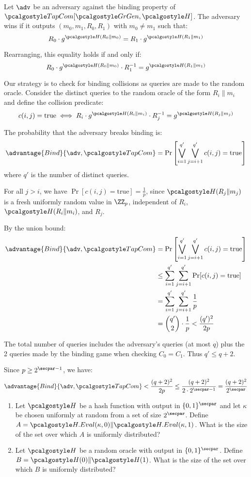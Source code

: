 \ifsolutions
\begin{mysolution}
  Let $\adv$ be an adversary against the binding property of $\algo{TapCom}[\grgen, \algo{H}]$. The adversary wins if it outputs $(m_0, m_1, R_0, R_1)$ with $m_0 \neq m_1$ such that:
  \[
  R_0 \cdot g^{\algo{H}(R_0 \| m_0)} = R_1 \cdot g^{\algo{H}(R_1 \| m_1)}
  \]

  Rearranging, this equality holds if and only if:
  \[
  R_0 \cdot g^{\algo{H}(R_0 \| m_0)} \cdot R_1^{-1} = g^{\algo{H}(R_1 \| m_1)}
  \]

  Our strategy is to check for binding collisions as queries are made to the random oracle.
  Consider the distinct queries to the random oracle of the form $R_i \| m_i$ and define the collision predicate:
  \[
  c(i, j) = \text{true} \iff R_i \cdot g^{\algo{H}(R_i \| m_i)} \cdot R_j^{-1} = g^{\algo{H}(R_j \| m_j)}
  \]
  
  The probability that the adversary breaks binding is:
  \[
  \advantage{Bind}{\adv, \algo{TapCom}} = \Pr\left[\bigvee_{i=1}^{q'} \bigvee_{j=i+1}^{q'} c(i,j) = \text{true}\right]
  \]
  where $q'$ is the number of distinct queries.
  
  For all $j > i$, we have $\Pr[c(i,j) = \text{true}] = \frac{1}{p}$, since $\algo{H}(R_j \| m_j)$ is a fresh uniformly random value in $\ZZ_p$, independent of $R_i$, $\algo{H}(R_i \| m_i)$, and $R_j$.
  
  By the union bound:
  \begin{align*}
    \advantage{Bind}{\adv, \algo{TapCom}} &= \Pr\left[\bigvee_{i=1}^{q'} \bigvee_{j=i+1}^{q'} c(i,j) = \text{true}\right] \\
    &\leq \sum_{i=1}^{q'} \sum_{j=i+1}^{q'} \Pr[c(i,j) = \text{true}] \\
    &= \sum_{i=1}^{q'} \sum_{j=i+1}^{q'} \frac{1}{p} \\
    &= \binom{q'}{2} \cdot \frac{1}{p} < \frac{(q')^2}{2p}
  \end{align*}
  
  The total number of queries includes the adversary's queries (at most $q$) plus the 2 queries made by the binding game when checking $C_0 = C_1$. Thus $q' \leq q + 2$.
  
  Since $p \geq 2^{\secpar-1}$, we have:
  \[
  \advantage{Bind}{\adv, \algo{TapCom}} < \frac{(q+2)^2}{2p} \leq \frac{(q+2)^2}{2 \cdot 2^{\secpar-1}} = \frac{(q+2)^2}{2^\secpar}
  \]
\end{mysolution}
\fi

\begin{exercise}[Optional]
  \begin{enumerate}
    \item Let $\algo{H}$ be a hash function with output in $\{0,1\}^\secpar$ and let $\kappa$ be chosen uniformly at random from a set of size $2^\secpar$. Define $A = \algo{H.Eval}(\kappa, 0) \| \algo{H.Eval}(\kappa, 1)$. What is the size of the set over which $A$ is uniformly distributed?
    \item Let $\algo{H}$ be a random oracle with output in $\{0,1\}^\secpar$. Define $B = \algo{H}(0) \| \algo{H}(1)$. What is the size of the set over which $B$ is uniformly distributed?
  \end{enumerate}
\end{exercise}

